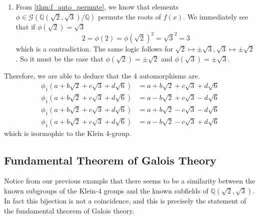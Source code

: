 \begin{example}
\begin{enumerate}
    \item From \ref{thm:f_auto_permute}, we know that elements $\phi \in \mathcal{G}(\mathbb{Q}(\sqrt{2}, \sqrt{3}) / \mathbb{Q})$ permute the roots of $f(x)$. We immediately see that if $\phi(\sqrt{2}) = \sqrt{3}$
      \begin{equation}
        2 = \phi(2) = \phi(\sqrt{2})^2 = \sqrt{3}^2 = 3
      \end{equation}
      which is a contradiction. The same logic follows for $\sqrt{2} \mapsto \pm \sqrt{3}, \sqrt{3} \mapsto \pm \sqrt{2}$. So it must be the case that $\phi(\sqrt{2}) = \pm \sqrt{2}$ and $\phi(\sqrt{3}) = \pm \sqrt{3}$. 
    \end{enumerate}
    Therefore, we are able to deduce that the 4 automorphisms are. 
    \begin{align}
      \phi_1 (a + b \sqrt{2} + c \sqrt{3} + d \sqrt{6}) & = a + b \sqrt{2} + c \sqrt{3} + d \sqrt{6} \\
      \phi_1 (a + b \sqrt{2} + c \sqrt{3} + d \sqrt{6}) & = a - b \sqrt{2} + c \sqrt{3} - d \sqrt{6} \\
      \phi_1 (a + b \sqrt{2} + c \sqrt{3} + d \sqrt{6}) & = a + b \sqrt{2} - c \sqrt{3} - d \sqrt{6} \\
      \phi_1 (a + b \sqrt{2} + c \sqrt{3} + d \sqrt{6}) & = a - b \sqrt{2} - c \sqrt{3} + d \sqrt{6}
    \end{align}
    which is isormophic to the Klein 4-group. 
  \end{example}

  \begin{example}
    
  \end{example}

\subsection{Fundamental Theorem of Galois Theory}

  Notice from our previous example that there seems to be a similarity between the known subgroups of the Klein-4 groups and the known subfields of $\mathbb{Q}(\sqrt{2}, \sqrt{3})$. In fact this bijection is not a coincidence, and this is precisely the statement of the fundamental theorem of Galois theory. 

